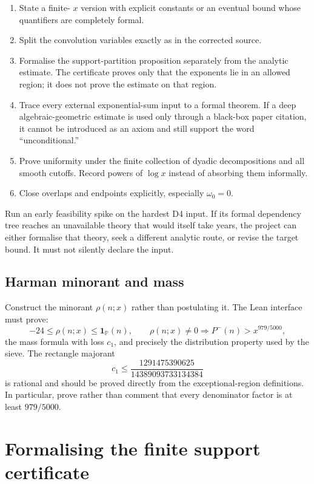 \documentclass[11pt]{article}
\begin{document}
\begin{enumerate}[label=D\arabic*.,leftmargin=3.2em]
\item State a finite-
\(x\) version with explicit constants or an eventual bound whose quantifiers
are completely formal.
\item Split the convolution variables exactly as in the corrected source.
\item Formalise the support-partition proposition separately from the analytic
estimate.  The certificate proves only that the exponents lie in an allowed
region; it does not prove the estimate on that region.
\item Trace every external exponential-sum input to a formal theorem.  If a
deep algebraic-geometric estimate is used only through a black-box paper
citation, it cannot be introduced as an axiom and still support the word
``unconditional.''
\item Prove uniformity under the finite collection of dyadic decompositions and
all smooth cutoffs.  Record powers of \(\log x\) instead of absorbing them
informally.
\item Close overlaps and endpoints explicitly, especially \(\omega_0=0\).
\end{enumerate}

Run an early feasibility spike on the hardest D4 input.  If its formal
dependency tree reaches an unavailable theory that would itself take years,
the project can either formalise that theory, seek a different analytic route,
or revise the target bound.  It must not silently declare the input.

\subsection{Harman minorant and mass}

Construct the minorant \(\rho(n;x)\) rather than postulating it.  The Lean
interface must prove:
\[
 -24\leq\rho(n;x)\leq\mathbf 1_{\mathbb P}(n),\qquad
 \rho(n;x)\ne0\Longrightarrow P^-(n)>x^{979/5000},
\]
the mass formula with loss \(c_1\), and precisely the distribution property
used by the sieve.  The rectangle majorant
\[
 c_1\leq
 \frac{1291475390625}{14389093733134384}
\]
is rational and should be proved directly from the exceptional-region
definitions.  In particular, prove rather than comment that every denominator
factor is at least \(979/5000\).

\section{Formalising the finite support certificate}
\end{document}
